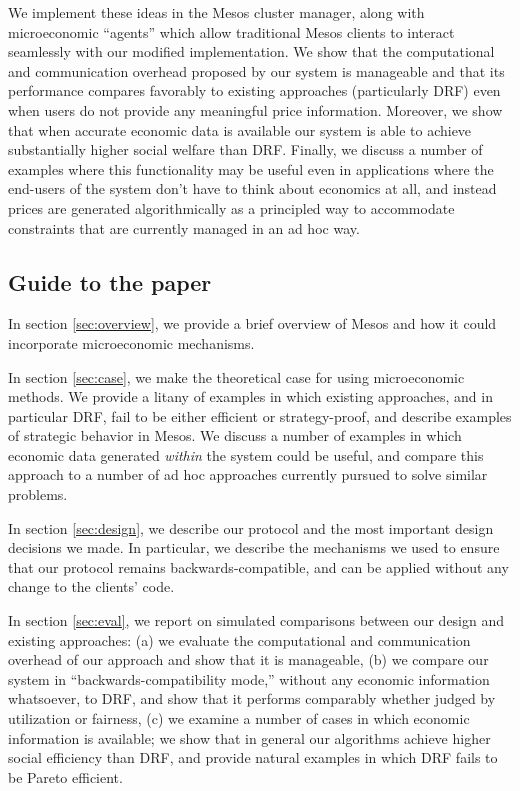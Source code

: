 \documentclass{acm_proc_article-sp}
\begin{document}
We implement these ideas in the Mesos cluster manager, along with microeconomic
``agents'' which allow traditional Mesos clients to interact seamlessly with our
modified implementation. We show that the computational and communication
overhead proposed by our system is manageable and that its performance compares
favorably to existing approaches (particularly DRF) even when users do not
provide any meaningful price information. Moreover, we show that when accurate
economic data is available our system is able to achieve substantially higher
social welfare than DRF. Finally, we discuss a number of examples where this
functionality may be useful even in applications where the end-users of the
system don't have to think about economics at all, and instead prices are
generated algorithmically as a principled way to accommodate constraints that
are currently managed in an ad hoc way.

\subsection{Guide to the paper}

In section \ref{sec:overview}, we provide a brief overview of Mesos and how it
could incorporate microeconomic mechanisms.

In section \ref{sec:case}, we make the theoretical case for using microeconomic methods. We
provide a litany of examples in which existing approaches, and in particular
DRF, fail to be either efficient or strategy-proof, and describe examples of
strategic behavior in Mesos. We discuss a number of examples in which economic
data generated \emph{within} the system could be useful, and compare this approach to a
number of ad hoc approaches currently pursued to solve similar problems.

In section \ref{sec:design}, we describe our protocol and the most important design decisions
we made. In particular, we describe the mechanisms we used to ensure that our
protocol remains backwards-compatible, and can be applied without any change to
the clients’ code.

In section \ref{sec:eval}, we report on simulated comparisons between our
design and existing approaches: (a) we evaluate the computational and communication
overhead of our approach and show that it is manageable, (b) we compare our
system in ``backwards-compatibility mode,'' without any economic information
whatsoever, to DRF, and show that it performs comparably whether judged by
utilization or fairness, (c) we examine a number of cases in which economic
information is available; we show that in general our algorithms achieve higher
social efficiency than DRF, and provide natural examples in which DRF fails to
be Pareto efficient.
\end{document}
